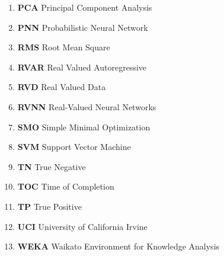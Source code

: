 \documentclass[a4paper, 14pt, oneside]{Thesis}
\begin{document}
\begin{enumerate}
\item {\bf PCA}{ Principal Component Analysis}
\item {\bf PNN }{ Probabilistic Neural Network}
\item {\bf RMS}{ Root Mean Square}  
\item {\bf RVAR}{ Real Valued Autoregressive}
\item {\bf RVD}{ Real Valued Data}
\item {\bf RVNN}{ Real-Valued Neural Networks}
\item {\bf SMO}{ Simple Minimal Optimization}
\item {\bf SVM}{ Support Vector Machine}  
\item {\bf TN}{ True Negative }
\item {\bf TOC}{ Time of Completion}
\item {\bf TP}{ True Positive}
\item {\bf UCI}{ University of California Irvine}
\item {\bf WEKA}{ Waikato Environment for Knowledge Analysis}  
\end{enumerate}



\mainmatter	  %
\pagestyle{myheadings}  %

\begin{spacing}{1.5}

\end{spacing}
\newpage
\appendix
\end{document}
